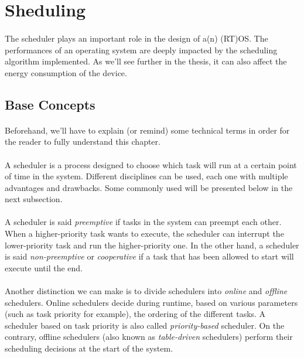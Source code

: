 \section{Sheduling}

\paragraph{}
The scheduler plays an important role in the design of a(n) (RT)OS.
The performances of an operating system are deeply impacted by the scheduling algorithm implemented.
As we'll see further in the thesis, it can also affect the energy consumption of the device.\\

\subsection{Base Concepts}
\paragraph{}
Beforehand, we'll have to explain (or remind) some technical terms in order for the reader to fully understand this chapter.

\paragraph{}
A scheduler is a process designed to choose which task will run at a certain point of time in the system.
Different disciplines can be used, each one with multiple advantages and drawbacks.
Some commonly used will be presented below in the next subsection.

\paragraph{}
A scheduler is said \textit{preemptive} if tasks in the system can preempt each other.
When a higher-priority task wants to execute, the scheduler can interrupt the lower-priority task and run the higher-priority one.
In the other hand, a scheduler is said \textit{non-preemptive} or \textit{cooperative}
    if a task that has been allowed to start will execute until the end.

\paragraph{}
Another distinction we can make is to divide schedulers into \textit{online} and \textit{offline} schedulers.
Online schedulers decide during runtime, based on various parameters (such as task priority for example), the ordering of the different tasks.
A scheduler based on task priority is also called \textit{priority-based} scheduler.
On the contrary, offline schedulers (also known as \textit{table-driven} schedulers) perform their scheduling decisions at the start of the system.


